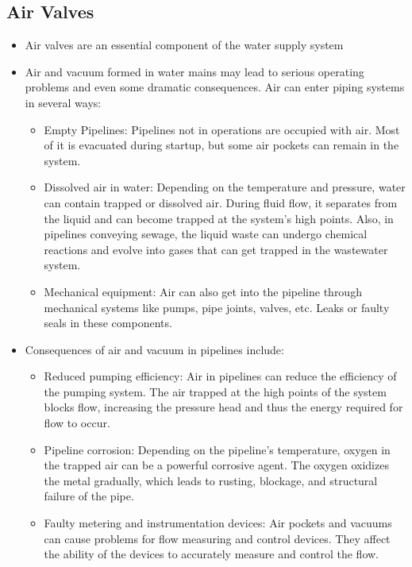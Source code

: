 \subsection{Air Valves}

  \begin{itemize}
   \item Air valves are an essential component of the water supply system
\item Air and vacuum formed in water mains may lead to serious operating problems and even some dramatic consequences. Air can enter piping systems in several ways:
\begin{itemize}
\item Empty Pipelines:  Pipelines not in operations are occupied with air. Most of it is evacuated during startup, but some air pockets can remain in the system.
 
\item Dissolved air in water: Depending on the temperature and pressure, water can contain trapped or dissolved air. During fluid flow, it separates from the liquid and can become trapped at the system’s high points. Also, in pipelines conveying sewage, the liquid waste can undergo chemical reactions and evolve into gases that can get trapped in the wastewater system.
 
\item Mechanical equipment: Air can also get into the pipeline through mechanical systems like pumps, pipe joints, valves, etc. Leaks or faulty seals in these components.

\end{itemize}
\item Consequences of air and vacuum in pipelines include:
\begin{itemize}
\item Reduced pumping efficiency: Air in pipelines can reduce the efficiency of the pumping system. The air trapped at the high points of the system blocks flow, increasing the pressure head and thus the energy required for flow to occur.
 
\item Pipeline corrosion: Depending on the pipeline's temperature, oxygen in the trapped air can be a powerful corrosive agent. The oxygen oxidizes the metal gradually, which leads to rusting, blockage, and structural failure of the pipe.
 
\item Faulty metering and instrumentation devices: Air pockets and vacuums can cause problems for flow measuring and control devices. They affect the ability of the devices to accurately measure and control the flow.
 

\end{itemize}
\end{itemize}
